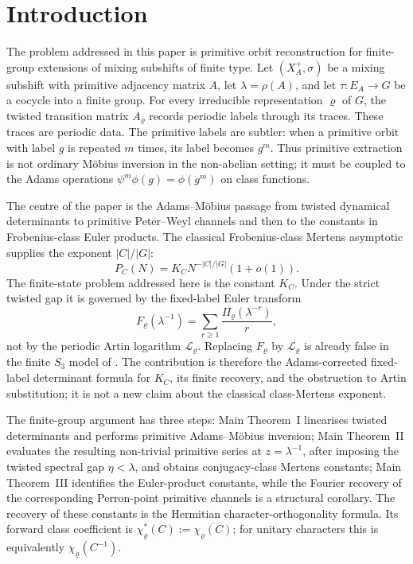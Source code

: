 \section{Introduction}\label{sec:introduction}

The problem addressed in this paper is primitive orbit reconstruction
for finite-group extensions of mixing subshifts of finite type. Let
\((X_A^+,\sigma)\) be a mixing subshift with primitive adjacency matrix
\(A\), let \(\lambda=\rho(A)\), and let \(\tau:E_A\to G\) be a cocycle
into a finite group. For every irreducible representation \(\varrho\)
of \(G\), the twisted transition matrix \(A_\varrho\) records periodic
labels through its traces. These traces are periodic data. The
primitive labels are subtler: when a primitive orbit with label \(g\)
is repeated \(m\) times, its label becomes \(g^m\). Thus primitive
extraction is not ordinary M\"obius inversion in the non-abelian
setting; it must be coupled to the Adams operations
\(\psi^m\phi(g)=\phi(g^m)\) on class functions.

The centre of the paper is the Adams--M\"obius passage from twisted
dynamical determinants to primitive Peter--Weyl channels and then to the
constants in Frobenius-class Euler products.  The classical
Frobenius-class Mertens asymptotic supplies the exponent
\(|C|/|G|\):
\[
  P_C(N)=K_C N^{-|C|/|G|}(1+o(1)).
\]
The finite-state problem addressed here is the constant \(K_C\).  Under
the strict twisted gap it is governed by the fixed-label Euler transform
\[
  F_\varrho(\lambda^{-1})
  =\sum_{r\ge1}\frac{\Pi_\varrho(\lambda^{-r})}{r},
\]
not by the periodic Artin logarithm \(\mathcal L_\varrho\).  Replacing
\(F_\varrho\) by \(\mathcal L_\varrho\) is already false in the finite
\(S_3\) model of .  The contribution is
therefore the Adams-corrected fixed-label determinant formula for
\(K_C\), its finite recovery, and the obstruction to Artin substitution;
it is not a new claim about the classical class-Mertens exponent.

The finite-group argument has three steps: Main Theorem~I linearises
twisted determinants and performs primitive Adams--M\"obius inversion;
Main Theorem~II evaluates the resulting non-trivial primitive series at
\(z=\lambda^{-1}\), after imposing the twisted spectral gap
\(\eta<\lambda\), and obtains conjugacy-class Mertens constants; Main
Theorem~III identifies the Euler-product constants, while the Fourier
recovery of the corresponding Perron-point primitive channels is a
structural corollary.  The recovery of these constants is the Hermitian
character-orthogonality formula. Its forward class coefficient is
\(\chi_\varrho^\ast(C):=\overline{\chi_\varrho(C)}\); for unitary
characters this is equivalently \(\chi_\varrho(C^{-1})\).

